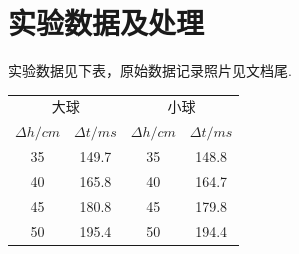 \documentclass[UTF8]{ctexart}
\begin{document}
\section{实验数据及处理}
实验数据见下表，原始数据记录照片见文档尾.
\begin{table}[H]
    \centering
    \begin{tabular}{cccc}
        \hline\hline
        \multicolumn{2}{c}{大球}&\multicolumn{2}{c}{小球}\\
        $\Delta h/cm$&$\Delta t/ms$&$\Delta h/cm$&$\Delta t/ms$\\
        \hline
        35&149.7&35&148.8\\
        40&165.8&40&164.7\\
        45&180.8&45&179.8\\
        50&195.4&50&194.4\\
        \hline\hline
    \end{tabular}
\end{table}
\end{document}
